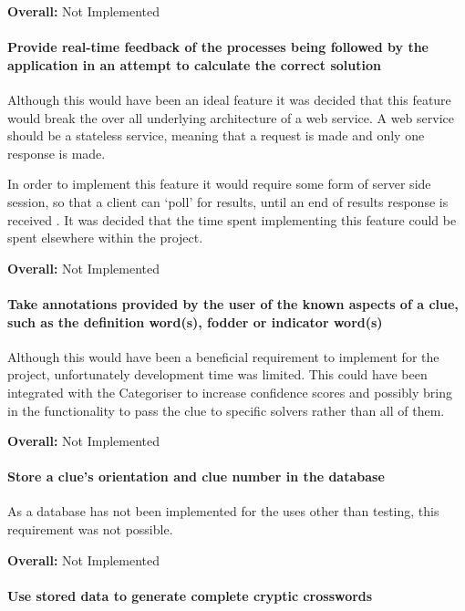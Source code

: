 {\bf Overall:} Not Implemented


\paragraph{Provide real-time feedback of the processes being followed by the
application in an attempt to calculate the correct solution}

Although this would have been an ideal feature it was decided that this feature
would break the over all underlying architecture of a web service. A web service
should be a stateless service, meaning that a request is made and only one 
response is made.

In order to implement this feature it would require some form of server side 
session, so that a client can `poll' for results, until an end of results 
response is received . It was decided that the time spent implementing this 
feature could be spent elsewhere within the project.

{\bf Overall:} Not Implemented


\paragraph{Take annotations provided by the user of the known aspects of a clue,
such as the definition word(s), fodder or indicator word(s)}

Although this would have been a beneficial requirement to implement for the
project, unfortunately development time was limited. This could have been
integrated with the Categoriser to increase confidence scores and possibly
bring in the functionality to pass the clue to specific solvers rather than all
of them.

{\bf Overall:} Not Implemented


\paragraph{Store a clue's orientation and clue number in the database}

As a database has not been implemented for the uses other than testing, this
requirement was not possible.

{\bf Overall:} Not Implemented


\paragraph{Use stored data to generate complete cryptic crosswords}


